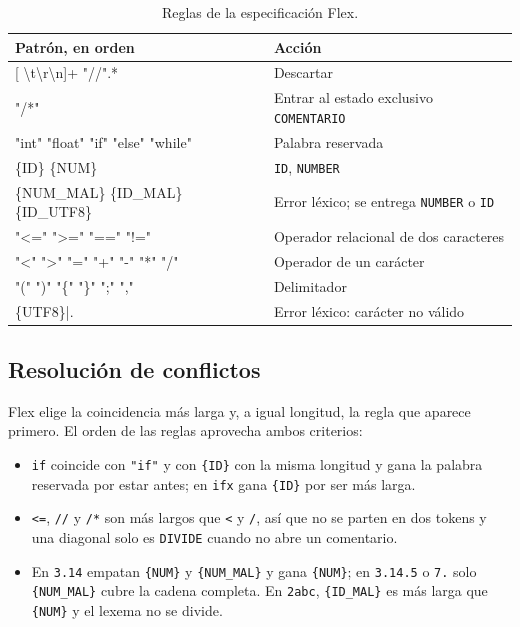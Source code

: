 \documentclass[12pt]{article}
\newcommand{\cmd}[1]{\texttt{\small #1}}
\begin{document}
\begin{table}[!htbp]
\centering\small
\begin{tabular}{@{}>{\ttfamily}l l@{}}
\toprule
\normalfont\textbf{Patrón, en orden} & \textbf{Acción} \\
\midrule
{}[ \textbackslash t\textbackslash r\textbackslash n]+ \quad "//".* & Descartar \\
"/*" & Entrar al estado exclusivo \cmd{COMENTARIO} \\
"int" "float" "if" "else" "while" & Palabra reservada \\
\{ID\} \quad \{NUM\} & \cmd{ID}, \cmd{NUMBER} \\
\{NUM\_MAL\} \quad \{ID\_MAL\} \quad \{ID\_UTF8\} & Error léxico; se entrega \cmd{NUMBER} o \cmd{ID} \\
"<=" ">=" "==" "!=" & Operador relacional de dos caracteres \\
"<" ">" "=" "+" "-" "*" "/" & Operador de un carácter \\
"(" ")" "\{" "\}" ";" "," & Delimitador \\
\{UTF8\}|. & Error léxico: carácter no válido \\
\bottomrule
\end{tabular}
\caption{Reglas de la especificación Flex.}
\label{tab:reglas}
\end{table}

\subsection{Resolución de conflictos}

Flex elige la coincidencia más larga y, a igual longitud, la regla que aparece primero. El orden
de las reglas aprovecha ambos criterios:

\begin{itemize}[leftmargin=1.1cm,itemsep=0.2em]
\item \cmd{if} coincide con \cmd{"if"} y con \cmd{\{ID\}} con la misma longitud y gana la palabra
reservada por estar antes; en \cmd{ifx} gana \cmd{\{ID\}} por ser más larga.
\item \cmd{<=}, \cmd{//} y \cmd{/*} son más largos que \cmd{<} y \cmd{/}, así que no se parten en
dos tokens y una diagonal solo es \cmd{DIVIDE} cuando no abre un comentario.
\item En \cmd{3.14} empatan \cmd{\{NUM\}} y \cmd{\{NUM\_MAL\}} y gana \cmd{\{NUM\}}; en
\cmd{3.14.5} o \cmd{7.} solo \cmd{\{NUM\_MAL\}} cubre la cadena completa. En \cmd{2abc},
\cmd{\{ID\_MAL\}} es más larga que \cmd{\{NUM\}} y el lexema no se divide.
\end{itemize}
\end{document}
